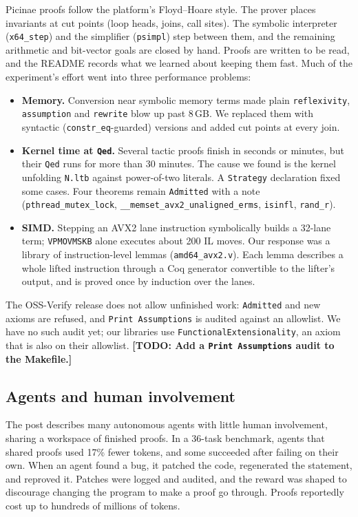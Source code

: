 \documentclass[11pt]{article}
\newcommand{\todo}[1]{\textbf{[TODO: #1]}}
\newcommand{\code}[1]{\texttt{#1}}
\begin{document}
Picinae proofs follow the platform's Floyd--Hoare style.  The prover places
invariants at cut points (loop heads, joins, call sites).  The symbolic
interpreter (\code{x64\_step}) and the simplifier (\code{psimpl}) step
between them, and the remaining arithmetic and bit-vector goals are closed
by hand.  Proofs are written to be read, and the README records what we
learned about keeping them fast.  Much of the experiment's effort went into
three performance problems:
\begin{itemize}[nosep]
\item \textbf{Memory.}  Conversion near symbolic memory terms made plain
      \code{reflexivity}, \code{assumption} and \code{rewrite} blow up past
      8\,GB.  We replaced them with syntactic (\code{constr\_eq}-guarded)
      versions and added cut points at every join.
\item \textbf{Kernel time at \code{Qed}.}  Several tactic proofs finish in
      seconds or minutes, but their \code{Qed} runs for more than 30
      minutes.  The cause we found is the kernel unfolding \code{N.ltb}
      against power-of-two literals.  A \code{Strategy} declaration fixed some
      cases.  Four theorems remain \code{Admitted} with a note
      (\code{pthread\_mutex\_lock}, \code{\_\_memset\_avx2\_unaligned\_erms},
      \code{isinfl}, \code{rand\_r}).
\item \textbf{SIMD.}  Stepping an AVX2 lane instruction symbolically builds
      a 32-lane term; \code{VPMOVMSKB} alone executes about 200 IL moves.
      Our response was a library of instruction-level lemmas
      (\code{amd64\_avx2.v}).  Each lemma describes a whole lifted
      instruction through a Coq generator convertible to the lifter's
      output, and is proved once by induction over the lanes.
\end{itemize}
The OSS-Verify release does not allow unfinished work: \code{Admitted} and
new axioms are refused, and \code{Print Assumptions} is audited against an
allowlist.  We have no such audit yet; our libraries use
\code{FunctionalExtensionality}, an axiom that is also on their allowlist.
\todo{Add a \code{Print Assumptions} audit to the Makefile.}

\subsection{Agents and human involvement}

The post describes many autonomous agents with little human involvement,
sharing a workspace of finished proofs.  In a 36-task benchmark, agents that
shared proofs used 17\% fewer tokens, and some succeeded after failing on
their own.  When an agent found a bug, it patched the code, regenerated the
statement, and reproved it.  Patches were logged and audited, and the reward
was shaped to discourage changing the program to make a proof go through.
Proofs reportedly cost up to hundreds of millions of tokens.
\end{document}
